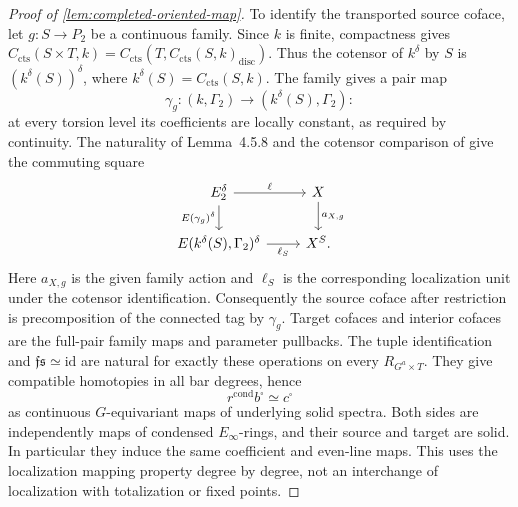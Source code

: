 \documentclass[11pt]{article}
\numberwithin{equation}{section}
\theoremstyle{definition}
\theoremstyle{remark}
\begin{document}
\begin{proof}[Proof of \cref{lem:completed-oriented-map}]
To identify the transported source coface, let \(g:S\to P_2\) be a
continuous family. Since \(k\) is finite, compactness gives
\(C_{\mathrm{cts}}(S\times T,k)=C_{\mathrm{cts}}(T,C_{\mathrm{cts}}(S,k)_{\mathrm{disc}})\).
Thus the cotensor of \(k^\delta\) by \(S\) is
\((k^\delta(S))^\delta\), where \(k^\delta(S)=C_{\mathrm{cts}}(S,k)\).
The family gives a pair map
\[
 \gamma_g:(k,\Gamma_2)\longrightarrow(k^\delta(S),\Gamma_2):
\]
at every torsion level its coefficients are locally constant, as required
by continuity. The naturality of Lemma~4.5.8 and the cotensor comparison
of \cite[Remark~4.5.6]{BMR2026} give the commuting square
\[
 \begin{tikzcd}
 E_2^\delta \arrow[r,"\ell"]
   \arrow[d,"E(\gamma_g)^\delta"'] &
 X \arrow[d,"a_{X,g}"]\\
 E(k^\delta(S),\Gamma_2)^\delta \arrow[r,"\ell_S"'] & X^S .
 \end{tikzcd}
\]
Here \(a_{X,g}\) is the given family action and \(\ell_S\) is the
corresponding localization unit under the cotensor identification.
Consequently the source coface after restriction is precomposition of the
connected tag by \(\gamma_g\). Target cofaces and interior cofaces are the
full-pair family maps and parameter pullbacks. The tuple identification
and \(\mathfrak f\mathfrak s\simeq\mathrm{id}\) are natural for exactly
these operations on every \(R_{G^a\times T}\). They give compatible
homotopies in all bar degrees, hence
\[
 r^{\mathrm{cond}}b^\square\simeq c^\square
\]
as continuous \(G\)-equivariant maps of underlying solid spectra.
Both sides are independently maps of condensed \(E_\infty\)-rings, and
their source and target are solid. In particular they induce the same
coefficient and even-line maps. This uses the localization mapping
property degree by degree, not an interchange of localization with
totalization or fixed points.

\end{proof}

\begingroup
\small



\endgroup
\end{document}
